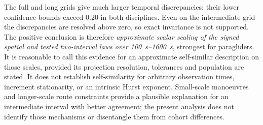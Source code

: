 The full and long grids give much larger temporal discrepancies: their lower
confidence bounds exceed 0.20 in both disciplines. Even on the intermediate
grid the discrepancies are resolved above zero, so exact invariance is not
supported. The positive conclusion is therefore \emph{approximate scalar
scaling of the signed spatial and tested two-interval laws over
\SIrange{100}{1600}{\second}}, strongest for paragliders. It is reasonable to
call this evidence for an approximate self-similar description on those scales,
provided its projection resolution, tolerances and population are stated.
It does not establish self-similarity for arbitrary observation times, increment
stationarity, or an intrinsic Hurst exponent. Small-scale manoeuvres and
longer-scale route constraints provide a plausible explanation for an
intermediate interval with better agreement; the present analysis does not
identify those mechanisms or disentangle them from cohort differences.
